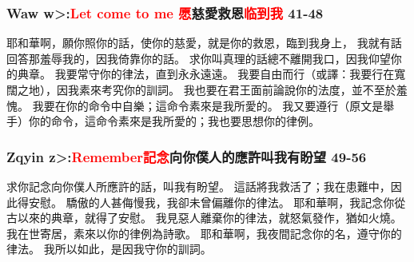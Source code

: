 \subsubsection{Waw  \<w>:\textcolor{red}{Let come to me 愿}慈愛救恩\textcolor{red}{临到我} 41-48}
耶和華啊，願你照你的話，使你的慈愛，就是你的救恩，臨到我身上，
我就有話回答那羞辱我的，因我倚靠你的話。
求你叫真理的話總不離開我口，因我仰望你的典章。
我要常守你的律法，直到永永遠遠。
我要自由而行（或譯：我要行在寬闊之地），因我素來考究你的訓詞。
我也要在君王面前論說你的法度，並不至於羞愧。
我要在你的命令中自樂；這命令素來是我所愛的。
我又要遵行（原文是舉手）你的命令，這命令素來是我所愛的；我也要思想你的律例。


\subsubsection{Zqyin  \<z>:\textcolor{red}{Remember記念}向你僕人的應許叫我有盼望 49-56}
求你記念向你僕人所應許的話，叫我有盼望。
這話將我救活了；我在患難中，因此得安慰。
驕傲的人甚侮慢我，我卻未曾偏離你的律法。
耶和華啊，我記念你從古以來的典章，就得了安慰。
我見惡人離棄你的律法，就怒氣發作，猶如火燒。
我在世寄居，素來以你的律例為詩歌。
耶和華啊，我夜間記念你的名，遵守你的律法。
我所以如此，是因我守你的訓詞。



